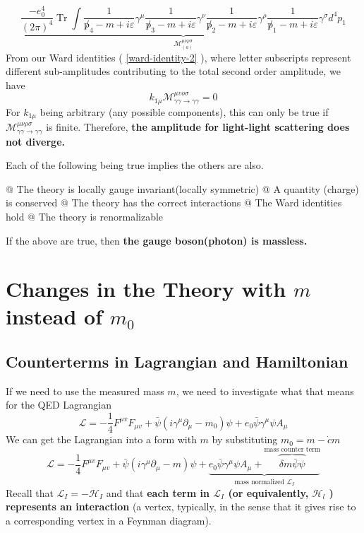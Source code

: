 $$\underbrace{\frac{-e_{0}^{4}}{(2 \pi)^{4}} \operatorname{Tr} \int \frac{1}{\not p_{4}-m+i \varepsilon} \gamma^{\mu} \frac{1}{\not p_{3}-m+i \varepsilon} \gamma^{\nu} \frac{1}{\not p_{2}-m+i \varepsilon} \gamma^{\rho} \frac{1}{\not p_{1}-m+i \varepsilon} \gamma^{\sigma} d^{4} p_{1}}_{\mathcal{M}^{\mu\nu\rho\sigma}_{(a)}}$$
From our Ward identities ( \ref{ward-identity-2} ), where letter subscripts represent different sub-amplitudes contributing to the total second order amplitude, we have
$$k_{1 \mu} \mathcal{M}_{\gamma\gamma \rightarrow \gamma\gamma}^{\mu v o \sigma}=0$$
For $k_{1 \mu}$ being arbitrary (any possible components), this can only be true if $\mathcal{M}^{\mu\nu\rho\sigma}_{\gamma\gamma \rightarrow \gamma\gamma}$ is finite. Therefore, \textbf{the amplitude for light-light scattering does not diverge.}
\begin{qt}
    Each of the following being true implies the others are also.
    \begin{easylist}
    \NewList
    @ The theory is locally gauge invariant(locally symmetric)
    @ A quantity (charge) is conserved
    @ The theory has the correct interactions
    @ The Ward identities hold
    @ The theory is renormalizable
    \end{easylist}
    If the above are true, then \textbf{the gauge boson(photon) is massless.}
\end{qt}

\section{Changes in the Theory with \texorpdfstring{$m$ instead of $m_0$}{TEXT}}
\subsection{Counterterms in Lagrangian and Hamiltonian}
If we need to use the measured mass $m$, we need to investigate what that means for the QED Lagrangian
$$\mathcal{L}=-\frac{1}{4} F^{\mu v} F_{\mu v}+\bar{\psi}\left(i \gamma^{\mu} \partial_{\mu}-m_{0}\right) \psi+e_{0} \bar{\psi} \gamma^{\mu} \psi A_{\mu}$$
We can get the Lagrangian into a form with $m$ by substituting $m_{0}=m-\dot{c} m$
\begin{equation}\mathcal{L}=-\frac{1}{4} F^{\mu v} F_{\mu v}+\bar{\psi}\left(i \gamma^{\mu} \partial_{\mu}-m\right) \psi+\underbrace{e_{0} \bar{\psi} \gamma^{\mu} \psi A_{\mu}+\overbrace{\delta m \bar{\psi} \psi}^{\text{mass counter term}}}_{\text{mass normalized }\mathcal{L}_I}
\end{equation}
Recall that $\mathcal{L}_{I}=-\mathcal{H}_{I}$ and that \textbf{each term in $\mathcal{L}_{I}$ (or equivalently, $\mathcal{H}_{l}$ ) represents an interaction} (a vertex, typically, in the sense that it gives rise to a corresponding vertex in a Feynman diagram).

